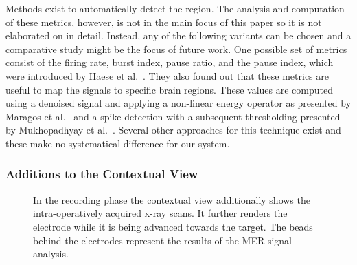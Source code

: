 \documentclass{vgtc}                          %
\begin{document}
Methods exist to automatically detect the region. The analysis and computation of these metrics, however, is not in the main focus of this paper so it is not elaborated on in detail. Instead, any of the following variants can be chosen and a comparative study might be the focus of future work. One possible set of metrics consist of the firing rate, burst index, pause ratio, and the pause index, which were introduced by Haese et al.~\cite{Haese2005}. They also found out that these metrics are useful to map the signals to specific brain regions. These values are computed using a denoised signal and applying a non-linear energy operator as presented by Maragos et al.~\cite{Maragos1993} and a spike detection with a subsequent thresholding presented by Mukhopadhyay et al.~\cite{Mukhopadhyay1998}. Several other approaches for this technique exist and these make no systematical difference for our system.

\subsubsection{Additions to the Contextual View}\label{sec:overview:recording:3d}
\begin{figure}
    \centering
    \caption{In the recording phase the contextual view additionally shows the intra-operatively acquired x-ray scans. It further renders the electrode while it is being advanced towards the target. The beads behind the electrodes represent the results of the MER signal analysis.}
    \label{fig:recordingphase:3d}
\end{figure}
\end{document}
